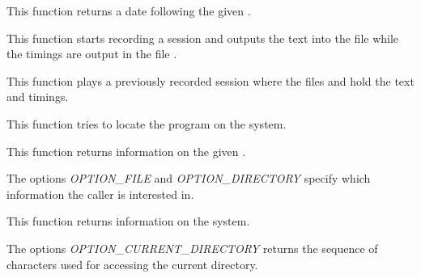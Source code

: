          {
	   This function returns a date following the given .
	 }

         {
	   This function starts recording a session and outputs
	   the text into the file  while the timings
	   are output in the file .
	 }

         {
	   This function plays a previously recorded session where
	   the files  and  hold the
	   text and timings.
	 }

         {
	   This function tries to locate the program 
	   on the system.
	 }

         {
	   This function returns information on the given .

	   \-

	   The options \textit{OPTION\_FILE} and \textit{OPTION\_DIRECTORY}
	   specify which information the caller is interested in.
	 }

         {
	   This function returns information on the system.

	   \-

	   The options \textit{OPTION\_CURRENT\_DIRECTORY} returns the
           sequence of characters used for accessing the current directory.
	 }
